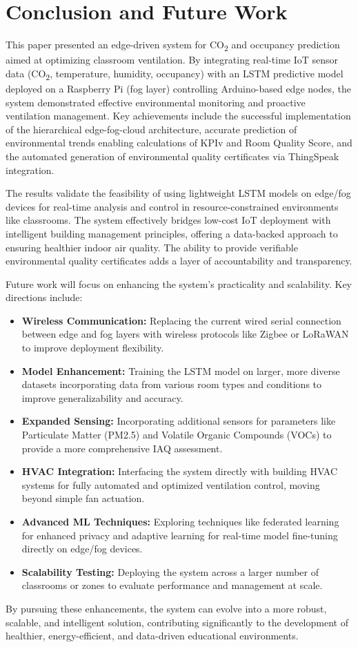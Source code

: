 \section{Conclusion and Future Work}
\label{sec:conclusion}

This paper presented an edge-driven system for CO\textsubscript{2} and occupancy prediction aimed at optimizing classroom ventilation. By integrating real-time IoT sensor data (CO\textsubscript{2}, temperature, humidity, occupancy) with an LSTM predictive model deployed on a Raspberry Pi (fog layer) controlling Arduino-based edge nodes, the system demonstrated effective environmental monitoring and proactive ventilation management. Key achievements include the successful implementation of the hierarchical edge-fog-cloud architecture, accurate prediction of environmental trends enabling calculations of KPIv and Room Quality Score, and the automated generation of environmental quality certificates via ThingSpeak integration.

The results validate the feasibility of using lightweight LSTM models on edge/fog devices for real-time analysis and control in resource-constrained environments like classrooms. The system effectively bridges low-cost IoT deployment with intelligent building management principles, offering a data-backed approach to ensuring healthier indoor air quality. The ability to provide verifiable environmental quality certificates adds a layer of accountability and transparency.

Future work will focus on enhancing the system's practicality and scalability. Key directions include:
\begin{itemize}
    \item \textbf{Wireless Communication:} Replacing the current wired serial connection between edge and fog layers with wireless protocols like Zigbee or LoRaWAN to improve deployment flexibility.
    \item \textbf{Model Enhancement:} Training the LSTM model on larger, more diverse datasets incorporating data from various room types and conditions to improve generalizability and accuracy.
    \item \textbf{Expanded Sensing:} Incorporating additional sensors for parameters like Particulate Matter (PM2.5) and Volatile Organic Compounds (VOCs) to provide a more comprehensive IAQ assessment.
    \item \textbf{HVAC Integration:} Interfacing the system directly with building HVAC systems for fully automated and optimized ventilation control, moving beyond simple fan actuation.
    \item \textbf{Advanced ML Techniques:} Exploring techniques like federated learning for enhanced privacy and adaptive learning for real-time model fine-tuning directly on edge/fog devices.
    \item \textbf{Scalability Testing:} Deploying the system across a larger number of classrooms or zones to evaluate performance and management at scale.
\end{itemize}
By pursuing these enhancements, the system can evolve into a more robust, scalable, and intelligent solution, contributing significantly to the development of healthier, energy-efficient, and data-driven educational environments. 